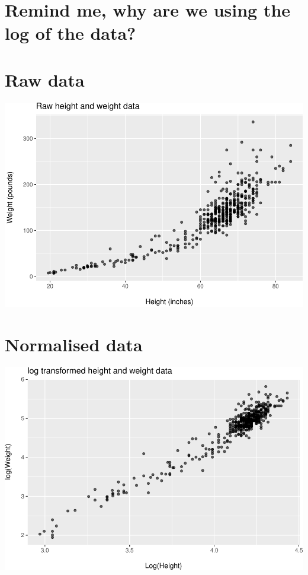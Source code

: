 \documentclass[
]{article}
\begin{document}
\hypertarget{remind-me-why-are-we-using-the-log-of-the-data}{%
\section{Remind me, why are we using the log of the
data?}\label{remind-me-why-are-we-using-the-log-of-the-data}}

\hypertarget{raw-data}{%
\section{Raw data}\label{raw-data}}

\includegraphics{L7_Correlation_and_regression_pdf_files/figure-latex/unnamed-chunk-4-1.pdf}

\hypertarget{normalised-data}{%
\section{Normalised data}\label{normalised-data}}

\includegraphics{L7_Correlation_and_regression_pdf_files/figure-latex/unnamed-chunk-5-1.pdf}
\end{document}
